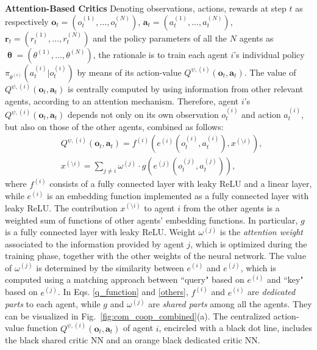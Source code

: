 \textbf{Attention-Based Critics} Denoting observations, actions, rewards at step $t$ as respectively $\mathbf{o}_t=(o^{(1)}_{t},\dots,o^{(N)}_{t})$, $\mathbf{a}_t=(a^{(1)}_{t},\dots,a^{(N)}_{t})$, $\mathbf{r}_t=(r^{(1)}_{t},\dots,r^{(N)}_{t})$ and the policy parameters of all the $N$ agents as $\boldsymbol{\uptheta}=(\theta^{(1)},\dots,\theta^{(N)})$,
the rationale is to train each agent $i$'s individual policy $\pi_{\theta^{(i)}}(a^{(i)}_t|o^{(i)}_t)$ by means of its action-value $Q^{\psi,(i)}(\mathbf{o}_t,\mathbf{a}_t)$. The value of $Q^{\psi,(i)}(\mathbf{o}_t,\mathbf{a}_t)$ is centrally computed by using information from other relevant agents, according to an attention mechanism. Therefore, agent $i$'s $Q^{\psi,(i)}(\mathbf{o}_t,\mathbf{a}_t)$ depends not only on its own observation $o^{(i)}_t$ and action $a^{(i)}_t$, but also on those of the other agents, combined as follows:
\begin{align}
	&Q^{\psi,(i)}(\mathbf{o}_t,\mathbf{a}_t) = f^{(i)}(e^{(i)}(o^{(i)}_t, a^{(i)}_t), x^{(\setminus i)}), \label{q_function}\\
	&x^{(\setminus i)} = \sum\nolimits_{j\neq i}\omega^{(j)} \cdot g(e^{(j)}(o^{(j)}_t,a^{(j)}_t)), \label{others}
\end{align}
where $f^{(i)}$ consists of a fully connected layer with leaky ReLU and a linear layer, while $e^{(i)}$ is an embedding function implemented as a fully connected layer with leaky ReLU. The contribution $x^{(\setminus i)}$ to agent $i$ from the other agents is a weighted sum of functions of other agents' embedding functions. In particular, $g$ is a fully connected layer with leaky ReLU. Weight $\omega^{(j)}$ is the \textit{attention weight} associated to the information provided by agent $j$, which is optimized during the training phase, together with the other weights of the neural network. The value of $\omega^{(j)}$ is determined by the similarity between $e^{(i)}$ and $e^{(j)}$, which is computed using a matching approach between ``query" based on $e^{(i)}$ and ``key" based on $e^{(j)}$.
In Eqs. \eqref{q_function} and \eqref{others}, $f^{(i)}$ and $e^{(i)}$ are \emph{dedicated parts} to each agent, while $g$ and $\omega^{(j)}$ are \textit{shared parts} among all the agents. They can be visualized in Fig.~\ref{fig:com_coop_combined}(a). The centralized action-value function $Q^{\psi,(i)}(\mathbf{o}_t,\mathbf{a}_t)$ of agent $i$, encircled with a black dot line, includes the black shared critic NN and an orange black dedicated critic NN.

